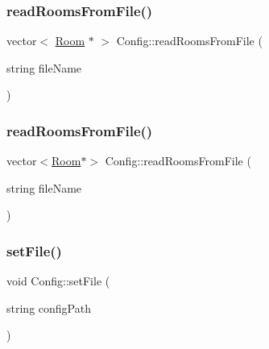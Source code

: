 \mbox{\label{class_config_a585a61660c48877296ed9409c83b01c5}} 
\subsubsection{\texorpdfstring{read\+Rooms\+From\+File()}{readRoomsFromFile()}\hspace{0.1cm}{\footnotesize\ttfamily [1/2]}}
{\footnotesize\ttfamily vector$<$ \hyperlink{class_room}{Room} $\ast$ $>$ Config\+::read\+Rooms\+From\+File (\begin{DoxyParamCaption}\item[{string}]{file\+Name }\end{DoxyParamCaption})\hspace{0.3cm}{\ttfamily [private]}}

\mbox{\label{class_config_a8da1c4e1553854e6f248867f168de9ad}} 
\subsubsection{\texorpdfstring{read\+Rooms\+From\+File()}{readRoomsFromFile()}\hspace{0.1cm}{\footnotesize\ttfamily [2/2]}}
{\footnotesize\ttfamily vector$<$\hyperlink{class_room}{Room}$\ast$$>$ Config\+::read\+Rooms\+From\+File (\begin{DoxyParamCaption}\item[{string}]{file\+Name }\end{DoxyParamCaption})\hspace{0.3cm}{\ttfamily [private]}}

\mbox{\label{class_config_a06542bc14d3414c075a9cbb04f1e9a37}} 
\subsubsection{\texorpdfstring{set\+File()}{setFile()}\hspace{0.1cm}{\footnotesize\ttfamily [1/2]}}
{\footnotesize\ttfamily void Config\+::set\+File (\begin{DoxyParamCaption}\item[{string}]{config\+Path }\end{DoxyParamCaption})}

